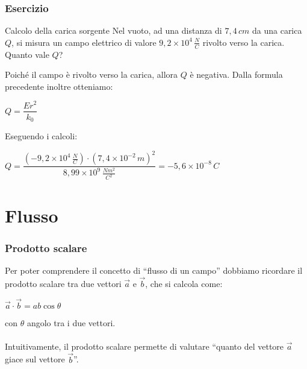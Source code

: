 \documentclass[handout]{beamer}
\theoremstyle{plain}
\begin{document}
\begin{frame}
\frametitle{Esercizio}

  \begin{exampleblock}{Calcolo della carica sorgente}
{\small Nel vuoto, ad una distanza di $ 7,4 \, cm $ da una carica $ Q $, si misura un campo elettrico di valore $ 9,2 \times 10^{4} \, \frac{N}{C} $ rivolto verso la carica. Quanto vale $ Q $?}
\end{exampleblock}
  \pause
  Poiché il campo è rivolto verso la carica, allora $ Q $ è negativa.{\pause} Dalla formula precedente inoltre otteniamo:
  \begin{center}
  $ Q = \dfrac{Er^2}{k_0} $
  \end{center}\pause
Eseguendo i calcoli:
  \begin{center}
  $ Q = \dfrac{ \left( -9,2 \times 10^4 \, \frac{N}{C}\right) \cdot ( 7,4 \times 10^{-2} \, m)^2 }{8,99 \times10^9 \, \frac{Nm^2}{C^2}} = - 5,6 \times 10^{-8} \, C $
  \end{center}
\end{frame}





\section{Flusso}


\begin{frame}
\frametitle{Prodotto scalare}
Per poter comprendere il concetto di ``flusso di un campo'' dobbiamo ricordare il \alert<1>{prodotto scalare tra due vettori $ \vec{a} $ e $ \vec{b} $}, che si calcola come:
  \begin{center}
  $ \vec{a} \cdot \vec{b} = a b \cos\theta $
  \end{center}
  con $ \theta $ angolo tra i due vettori.\\\pause~\\
  Intuitivamente, il prodotto scalare permette di valutare ``quanto del vettore $ \vec{a} $ giace sul vettore $ \vec{b} $''.
\end{frame}
\end{document}
